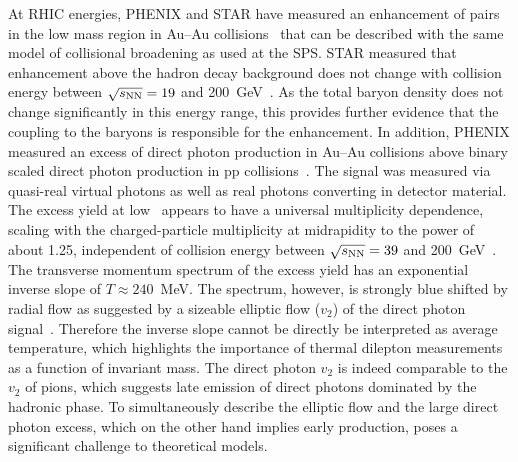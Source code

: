 \documentclass[../report.tex]{subfiles}
\begin{document}
At RHIC energies, PHENIX and STAR have measured an enhancement of \Pepem pairs in the low mass region in Au--Au collisions~\cite{Adare:2009qk,Adare:2015ila,Adamczyk:2013caa,Adamczyk:2015mmx} that can be described with the same model of collisional broadening as used at the SPS. STAR measured that enhancement above the hadron decay background does not change with collision energy between $\sqrt{s_{\rm NN}}=19$ and 200~GeV~\cite{Adamczyk:2015mmx}. As the total baryon density does not change significantly in this energy range, this provides further evidence that the \Prho coupling to the baryons is responsible for the enhancement. In addition, PHENIX measured an excess of direct photon production in Au--Au collisions above binary scaled direct photon production in pp collisions~\cite{Adare:2008ab,Adare:2014fwh,Adare:2018wgc}. The signal was measured via quasi-real virtual photons as well as real photons converting in detector material. The excess yield at low \pT~appears to have a universal multiplicity dependence, scaling with the charged-particle multiplicity at midrapidity to the power of about 1.25, independent of collision energy between $\sqrt{s_{\rm NN}} = 39$ and 200~GeV~\cite{Adare:2018wgc}. The transverse momentum spectrum of the excess yield has an exponential inverse slope of $T\approx240$~MeV. The spectrum, however, is strongly blue shifted by radial flow as suggested by a sizeable elliptic flow ($v_2$) of the direct photon signal~\cite{Adare:2011zr}. Therefore the inverse slope cannot be directly be interpreted as average temperature, which highlights the importance of thermal dilepton measurements as a function of invariant mass. The direct photon $v_2$ is indeed comparable to the $v_2$ of pions, which suggests late emission of direct photons dominated by the hadronic phase. To simultaneously describe the elliptic flow and the large direct photon excess, which on the other hand implies early production, poses a significant challenge to theoretical models.
\end{document}
